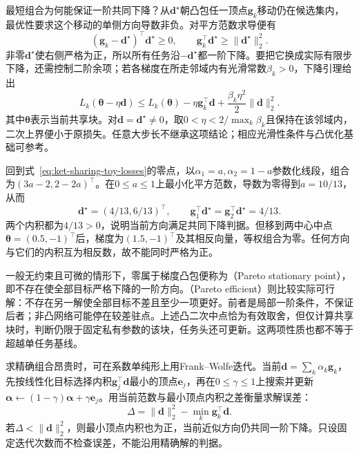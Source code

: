 最短组合为何能保证一阶共同下降？从$\bm d^\star$朝凸包任一顶点$\bm g_k$移动仍在候选集内，最优性要求这个移动的单侧方向导数非负。对平方范数求导便有
\begin{equation}
  (\bm g_k-\bm d^\star)^{\top}\bm d^\star\geq0,
  \qquad
  \bm g_k^{\top}\bm d^\star
  \geq\|\bm d^\star\|_2^2.
  \label{eq:ket-sharing-common-descent}
\end{equation}
非零$\bm d^\star$使右侧严格为正，所以所有任务沿$-\bm d^\star$都一阶下降。要把它换成实际有限步下降，还需控制二阶余项；若各梯度在所走邻域内有光滑常数$\beta_k>0$，下降引理给出
\begin{equation}
  L_k(\bm\theta-\eta\bm d)
  \leq L_k(\bm\theta)
  -\eta\bm g_k^{\top}\bm d
  +\frac{\beta_k\eta^2}{2}\|\bm d\|_2^2.
\end{equation}
其中$\bm\theta$表示当前共享块。对$\bm d=\bm d^\star\ne0$，取$0<\eta<2/\max_k\beta_k$且保持在该邻域内，二次上界便小于原损失。任意大步长不继承这项结论；相应光滑性条件与凸优化基础可参考。

回到式~\eqref{eq:ket-sharing-toy-losses}的零点，以$\alpha_1=a,\alpha_2=1-a$参数化线段，组合为$(3a-2,2-2a)^{\top}$。在$0\leq a\leq1$上最小化平方范数，导数为零得到$a=10/13$，从而
\begin{equation}
  \bm d^\star=(4/13,6/13)^{\top},
  \qquad
  \bm g_1^{\top}\bm d^\star
  =\bm g_2^{\top}\bm d^\star
  =4/13.
  \label{eq:ket-sharing-mgda-numbers}
\end{equation}
两个内积都为$4/13>0$，说明当前方向满足共同下降判据。但移到两中心中点$\bm\theta=(0.5,-1)^{\top}$后，梯度为$(1.5,-1)^{\top}$及其相反向量，等权组合为零。任何方向与它们的内积互为相反数，故不能同时严格为正。

一般无约束且可微的情形下，零属于梯度凸包便称为（Pareto stationary point），即不存在使全部目标严格下降的一阶方向。（Pareto efficient）则比较实际可行解：不存在另一解使全部目标不差且至少一项更好。前者是局部一阶条件，不保证后者；非凸网络可能停在较差驻点。上述凸二次中点恰为有效取舍，但仅计算共享块时，判断仍限于固定私有参数的该块，任务头还可更新。这两项性质也都不等于超越单任务基线。

求精确组合昂贵时，可在系数单纯形上用Frank--Wolfe迭代。当前$\bm d=\sum_k\alpha_k\bm g_k$，先按线性化目标选择内积$\bm g_j^{\top}\bm d$最小的顶点$\bm e_j$，再在$0\leq\gamma\leq1$上搜索并更新$\bm\alpha\leftarrow(1-\gamma)\bm\alpha+\gamma\bm e_j$。用当前范数与最小顶点内积之差衡量求解误差：
\begin{equation}
  \Delta=\|\bm d\|_2^2-\min_k\bm g_k^{\top}\bm d.
\end{equation}
若$\Delta<\|\bm d\|_2^2$，则最小顶点内积也为正，当前近似方向仍共同一阶下降。只设固定迭代次数而不检查误差，不能沿用精确解的判据。

